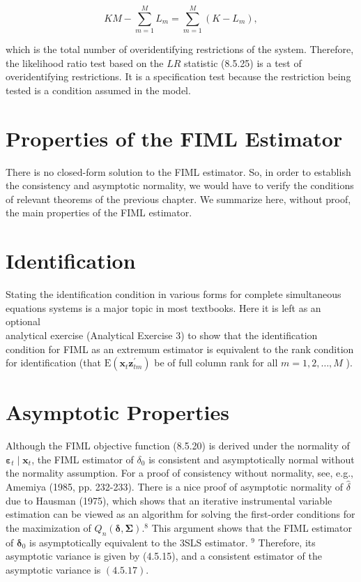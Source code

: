 \documentclass[10pt]{article}
\begin{document}
\begin{equation*}
K M-\sum_{m=1}^{M} L_{m}=\sum_{m=1}^{M}\left(K-L_{m}\right), \tag{8.5.26}
\end{equation*}


which is the total number of overidentifying restrictions of the system. Therefore, the likelihood ratio test based on the $L R$ statistic (8.5.25) is a test of overidentifying restrictions. It is a specification test because the restriction being tested is a condition assumed in the model.

\section*{Properties of the FIML Estimator}
There is no closed-form solution to the FIML estimator. So, in order to establish the consistency and asymptotic normality, we would have to verify the conditions of relevant theorems of the previous chapter. We summarize here, without proof, the main properties of the FIML estimator.

\section*{Identification}
Stating the identification condition in various forms for complete simultaneous equations systems is a major topic in most textbooks. Here it is left as an optional\\
analytical exercise (Analytical Exercise 3) to show that the identification condition for FIML as an extremum estimator is equivalent to the rank condition for identification (that $\mathrm{E}\left(\mathbf{x}_{t} \mathbf{z}_{t m}^{\prime}\right)$ be of full column rank for all $m=1,2, \ldots, M$ ).

\section*{Asymptotic Properties}
Although the FIML objective function (8.5.20) is derived under the normality of $\boldsymbol{\varepsilon}_{t} \mid \mathbf{x}_{t}$, the FIML estimator of $\delta_{0}$ is consistent and asymptotically normal without the normality assumption. For a proof of consistency without normality, see, e.g., Amemiya (1985, pp. 232-233). There is a nice proof of asymptotic normality of $\hat{\delta}$ due to Hausman (1975), which shows that an iterative instrumental variable estimation can be viewed as an algorithm for solving the first-order conditions for the maximization of $Q_{n}(\boldsymbol{\delta}, \boldsymbol{\Sigma}) .^{8}$ This argument shows that the FIML estimator of $\boldsymbol{\delta}_{0}$ is asymptotically equivalent to the 3SLS estimator. ${ }^{9}$ Therefore, its asymptotic variance is given by (4.5.15), and a consistent estimator of the asymptotic variance is $(4.5 .17)$.
\end{document}
